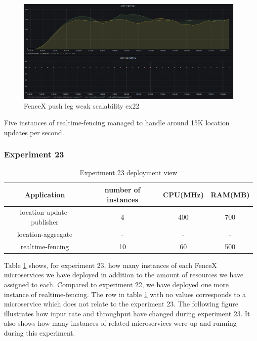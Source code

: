 \documentclass[a4]{report}
\begin{document}
    \begin{figure}
        \caption{FenceX push leg weak scalability ex22}
        \label{fig:ex22}
        \includegraphics[scale=0.5]{images/evaluation/ex22-benchmarking-ongoing-1per2sec.png}
    \end{figure}

    \clearpage

    Five instances of realtime-fencing managed to handle around 15K location updates per second.

    \subsubsection{Experiment 23}
    \begin{table}[h!]
        \centering
        \begin{tabular}{|c|c|c|c|}
            \hline
            Application               & number of instances & CPU(MHz) & RAM(MB) \\
            \hline
            location-update-publisher & 4                   & 400      & 700     \\
            location-aggregate        & -                   & -        & -       \\
            realtime-fencing          & 10                  & 60       & 500     \\
            \hline
        \end{tabular}
        \caption{Experiment 23 deployment view}
        \label{table:ex23-dv}
    \end{table}

    Table \ref{table:ex23-dv} shows, for experiment 23, how many instances of each FenceX microservices we have
    deployed in addition to the amount of resources we have assigned to each.
    Compared to experiment 22, we have deployed one more instance of realtime-fencing.
    The row in table \ref{table:ex23-dv} with no values corresponds to a microservice which does not relate to the
    experiment 23.
    The following figure illustrates how input rate and throughput have changed during experiment 23.
    It also shows how many instances of related microservices were up and running during this experiment.
\end{document}
